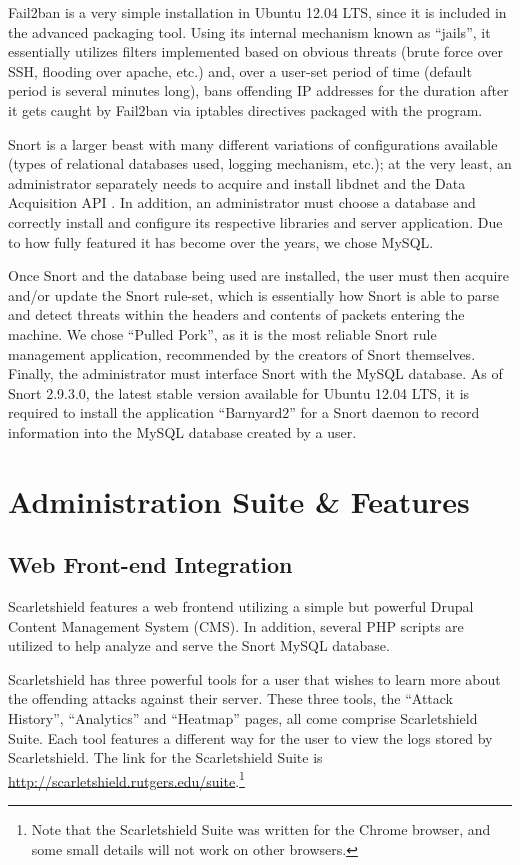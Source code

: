 \documentclass[12pt,letterpaper,titlepage]{report}
\begin{document}
{Fail2ban is a very simple installation in Ubuntu 12.04 LTS, since it is included
in the advanced packaging tool.  Using its internal mechanism known as ``jails'',
it essentially utilizes filters implemented based on obvious threats (brute
force over SSH, flooding over apache, etc.) and, over a user-set period of time
(default period is several minutes long), bans offending IP addresses for the
duration after it gets caught by Fail2ban via iptables directives packaged with
the program.

Snort is a larger beast with many different variations of configurations
available (types of relational databases used, logging mechanism, etc.); at the
very least, an administrator separately needs to acquire and install libdnet and
the Data Acquisition API \autocite{snort}.  In addition, an administrator must choose a
database and correctly install and configure its respective libraries and server
application.  Due to how fully featured it has become over the years, we chose
MySQL.



Once Snort and the database being used are installed, the user must then acquire
and/or update the Snort rule-set, which is essentially how Snort is able to parse
and detect threats within the headers and contents of packets entering the
machine.  We chose ``Pulled Pork'', as it is the most reliable Snort rule management
application, recommended by the creators of Snort themselves.  Finally, the
administrator must interface Snort with the MySQL database.  As of Snort
2.9.3.0, the latest stable version available for Ubuntu 12.04 LTS, it is
required to install the application ``Barnyard2'' for a Snort daemon to record
information into the MySQL database created by a user.

\chapter{Administration Suite \& Features}

\section{Web Front-end Integration}


Scarletshield features a web frontend utilizing a simple but powerful Drupal
Content Management System (CMS).  In addition, several PHP scripts are
utilized to help analyze and serve the Snort MySQL database.

Scarletshield has three powerful tools for a user that wishes to learn more
about the offending attacks against their server. These three tools, the ``Attack
History'', ``Analytics'' and ``Heatmap'' pages, all come comprise
Scarletshield Suite. Each tool features a different way for the user to view
the logs stored by Scarletshield. The link for the Scarletshield Suite is
\url{http://scarletshield.rutgers.edu/suite}.\footnote{Note that the Scarletshield Suite was
written for the Chrome browser, and some small details will not work on other
browsers.}

}
\end{document}
